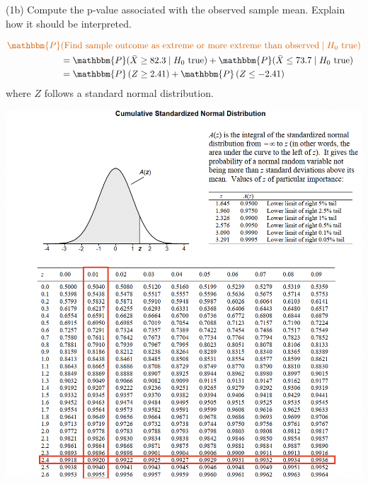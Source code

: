 \documentclass[
  11pt,
  ignorenonframetext,
]{beamer}
\begin{document}
\begin{frame}{(1b) Compute the p-value associated with the observed
sample mean. Explain how it should be interpreted.}
\protect\hypertarget{b-compute-the-p-value-associated-with-the-observed-sample-mean.-explain-how-it-should-be-interpreted.-3}{}
\small

\[
\begin{aligned}
\color{red}{\mathbbm{P}}&\color{red}{(\text{Find sample outcome as extreme or more extreme than observed}\mid H_0 \text{ true})}\\
&=\mathbbm{P}(\bar{X} \geq 82.3 \mid H_0 \text{ true}) + \mathbbm{P}(\bar{X} \leq 73.7 \mid H_0 \text{ true})\\
&=\mathbbm{P}\left(Z \geq 2.41 \right) +\mathbbm{P}\left(Z \leq -2.41 \right)
\end{aligned}
\] where \(Z\) follows a standard normal distribution.
\end{frame}

\begin{frame}{}
\protect\hypertarget{section-1}{}
\begin{center}\includegraphics[width=0.8\linewidth]{pictures/Zprob} \end{center}
\end{frame}
\end{document}
